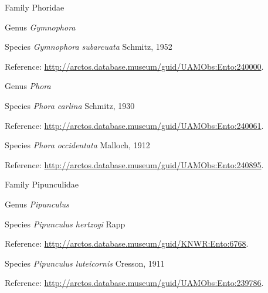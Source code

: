 \documentclass[9pt, article]{memoir}
\begin{document}
\begin{multicols}{2}
\vspace{6pt}\noindent\hspace{24pt}Family Phoridae


\vspace{6pt}\noindent\hspace{30pt}Genus \textit{Gymnophora}


\vspace{6pt}\noindent\hspace{36pt}Species \textit{Gymnophora subarcuata} Schmitz, 1952


\vspace{6pt}Reference: 
\url{http://arctos.database.museum/guid/UAMObs:Ento:240000}.

\vspace{6pt}\noindent\hspace{30pt}Genus \textit{Phora}


\vspace{6pt}\noindent\hspace{36pt}Species \textit{Phora carlina} Schmitz, 1930


\vspace{6pt}Reference: 
\url{http://arctos.database.museum/guid/UAMObs:Ento:240061}.

\vspace{6pt}\noindent\hspace{36pt}Species \textit{Phora occidentata} Malloch, 1912


\vspace{6pt}Reference: 
\url{http://arctos.database.museum/guid/UAMObs:Ento:240895}.

\vspace{6pt}\noindent\hspace{24pt}Family Pipunculidae


\vspace{6pt}\noindent\hspace{30pt}Genus \textit{Pipunculus}


\vspace{6pt}\noindent\hspace{36pt}Species \textit{Pipunculus hertzogi} Rapp


\vspace{6pt}Reference: 
\url{http://arctos.database.museum/guid/KNWR:Ento:6768}.

\vspace{6pt}\noindent\hspace{36pt}Species \textit{Pipunculus luteicornis} Cresson, 1911


\vspace{6pt}Reference: 
\url{http://arctos.database.museum/guid/UAMObs:Ento:239786}.


\end{multicols}
\end{document}
